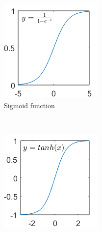 \documentclass[a4paper,11pt]{article}
\begin{document}
\begin{figure}[h]
        \centering
        \begin{subfigure}[b]{0.3\textwidth}
                \includegraphics[width=\textwidth]{sigmoid.png}
                \caption{Sigmoid function}
                \label{fig:sigmoid}
        \end{subfigure}
        ~ %
        \begin{subfigure}[b]{0.3\textwidth}
                \includegraphics[width=\textwidth]{tanh.png}

\end{subfigure}
\end{figure}
\end{document}
